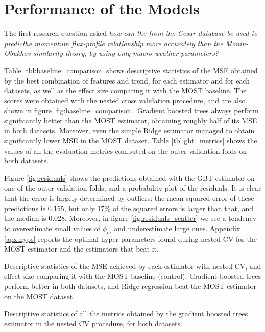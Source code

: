 \documentclass[a4paper,11pt]{kth-mag}
\begin{document}
 \section{Performance of the Models}
\label{sec:model_perf}
The first research question asked \emph{how can the from the Cesar database be used to predicthe momentum flux-profile relationship more accurately than the Monin-Obukhov similarity theory, by using only macro weather parameters?}

Table \ref{tbl:baseline_comparison} shows descriptive statistics of the MSE obtained by the best combination of features and trend, for each estimator and for each datasets, as well as the effect size comparing it with the MOST baseline. The scores were obtained with the nested cross validation procedure, and are also shown in figure \ref{fig:baseline_comparison}. Gradient boosted trees always perform significantly better than the MOST estimator, obtaining roughly half of its MSE in both datasets. Moreover, even the simple Ridge estimator managed to obtain significantly lower MSE in the MOST dataset. Table \ref{tbl:gbt_metrics} shows the values of all the evaluation metrics computed on the outer validation folds on both datasets.

Figure \ref{fig:residuals} shows the predictions obtained with the GBT estimator on one of the outer validation folds, and a probability plot of the residuals. It is clear that the error is largely determined by outliers: the mean squared error of these predictions is 0.155, but only 17\% of the squared errors is larger than that, and the median is 0.028. Moreover, in figure \ref{fig:residuals_scatter} we see a tendency to overestimate small values of $\phi_m$ and underestimate large ones. Appendix \ref{apx:hyps} reports the optimal hyper-parameters found during nested CV for the MOST estimator and the estimators that beat it.

\begin{table}
\caption{Descriptive statistics of the MSE achieved by each estimator with nested CV, and effect size comparing it with the MOST baseline (control). Gradient boosted trees perform better in both datasets, and Ridge regression beat the MOST estimator on the MOST dataset.}
\label{tbl:baseline_comparison}

\end{table}



\begin{table}
\caption{Descriptive statistics of all the metrics obtained by the gradient boosted trees estimator in the nested CV procedure, for both datasets.}
\label{tbl:gbt_metrics}

\end{table}
\end{document}
